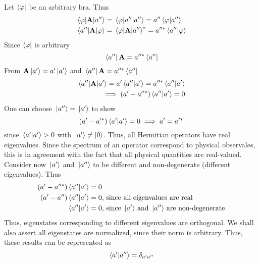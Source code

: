 \documentclass[12pt,a4paper,titlepage]{article}
\newcommand{\trm}[1]{\textrm{#1}} %
\begin{document}
Let $\bra{\varphi}$ be an arbitrary bra. Thus
\begin{equation}
\begin{aligned}
\mel*{\varphi}{\vb{A}}{a''}&=\mel*{\varphi}{a''}{a''}=a''\braket*{\varphi}{a''}\\
\mel*{a''}{\vb{A}}{\varphi}&=\mel*{\varphi}{\vb{A}}{a''}^{*}=a''^{*}\braket*{a''}{\varphi}
\end{aligned}
\end{equation}
Since $\bra{\varphi}$ is arbitrary
\begin{equation}
\bra*{a''}\vb{A}=a''^{*}\bra*{a''}
\end{equation}
From $\vb{A}\ket*{a'}=a'\ket*{a'}$ and $\bra*{a''}\vb{A}=a''^{*}\bra*{a''}$
\begin{equation}
\begin{aligned}
\mel*{a''}{\vb{A}}{a'}=a'\braket*{a''}{a'}=a''^{*}\braket*{a''}{a'}\\
\implies (a'-a''^{*})\braket*{a''}{a'}=0
\end{aligned}
\end{equation}
One can choose $\ket*{a''}=\ket*{a'}$ to show
\begin{equation}
(a'-a'^{*})\braket*{a'}{a'}=0 \implies a'=a'^{*}
\end{equation}
since $\braket*{a'}{a'}>0$ with $\ket*{a'}\neq\ket{0}$. Thus, all Hermitian operators have real eigenvalues. Since the spectrum of an operator correspond to physical observales, this is in agreement with the fact that all physical quantities are real-valued.\\

Consider now $\ket*{a'}$ and $\ket*{a''}$ to be different and non-degenerate (different eigenvalues). Thus
\begin{equation}
\begin{aligned}
(a'-a''^{*})\braket*{a''}{a'}&=0\\
(a'-a'')\braket*{a''}{a'}&=0\trm{, since all eigenvalues are real}\\
\braket*{a''}{a'}&=0\trm{, since $\ket*{a'}$ and $\ket*{a''}$ are non-degenerate}
\end{aligned}
\end{equation}
Thus, eigenstates corresponding to different eigenvalues are orthogonal. We shall also assert all eigenstates are normalized, since their norm is arbitrary. Thus, these results can be represented as 
\begin{equation}
\braket*{a'}{a''}=\delta_{a'a''}
\end{equation}
\end{document}
